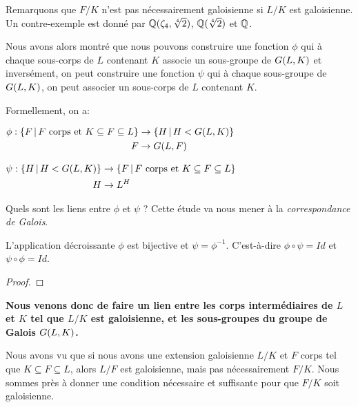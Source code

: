 Remarquons que $F/K$ n'est pas nécessairement galoisienne si $L/K$ est
galoisienne. Un contre-exemple est donné par $\mathbb{Q}(\zeta_{4},
\sqrt[4]{2})$, $\mathbb{Q}(\sqrt[4]{2})$ et $\mathbb{Q}$.

Nous avons alors montré que nous pouvons construire une fonction $\phi$ qui à
chaque sous-corps de $L$ contenant $K$ associe un sous-groupe de
$G(L, K)$ et inversément, on peut construire une fonction $\psi$ qui
à chaque sous-groupe de $G(L, K)$, on peut associer un sous-corps de
$L$ contenant $K$.

Formellement, on a:

\begin{center}
	$
	\begin{aligned}
		\phi :
			\left\{F \, | \, F \text{ corps et } K \subseteq F \subseteq L \right\}
			&\rightarrow \left\{H \, | \, H < G(L, K) \right\}
			\\
			F &\rightarrow G(L, F)
	\end{aligned}
	$

	$
	\begin{aligned}
		\psi :
			\left\{H \, | \, H < G(L, K) \right\}
			&\rightarrow
			\left\{F \, | \, F \text{ corps et } K \subseteq F \subseteq L \right\}
			\\
			H &\rightarrow L^{H}
	\end{aligned}
	$
\end{center}

Quels sont les liens entre $\phi$ et $\psi$ ?
Cette étude va nous mener à la \textit{correspondance de Galois}.

\begin{theorem}
	\label{theorem:galois_correspondance}
	L'application décroissante $\phi$ est bijective et $\psi = \phi^{-1}$.
	C'est-à-dire $\phi \circ \psi = Id$ et $\psi \circ \phi = Id$.
\end{theorem}

\ifdefined\outputproof
\begin{proof}

\end{proof}
\fi

\textbf{Nous venons donc de faire un lien entre les corps intermédiaires de $L$ et
$K$ tel que $L/K$ est galoisienne, et les sous-groupes du groupe de Galois
$G(L, K)$.}

Nous avons vu que si nous avons une extension galoisienne $L/K$ et $F$ corps tel
que $K \subseteq F \subseteq L$, alors $L/F$ est galoisienne, mais pas
nécessairement $F/K$.
Nous sommes près à donner une condition nécessaire et suffisante pour que $F/K$
soit galoisienne.

